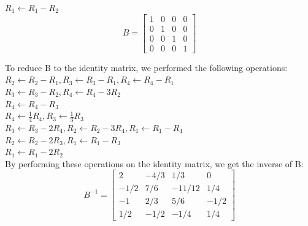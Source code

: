 \documentclass[a4paper]{article}
\begin{document}
\begin{enumerate}
\begin{enumerate}
            $R_1 \leftarrow R_1 - R_2$\\
            \[B = \begin{bmatrix} 1 & 0 & 0 & 0 \\ 0 & 1 & 0 & 0 \\ 0 & 0 & 1 & 0 \\ 0 & 0 & 0 & 1 \end{bmatrix}\]

            \newpage
            To reduce B to the identity matrix, we performed the following operations: \\
            $R_2 \leftarrow R_2 - R_1, R_3 \leftarrow R_3 - R_1, R_4 \leftarrow R_4 - R_1$\\
            $R_3 \leftarrow R_3 - R_2, R_4 \leftarrow R_4 - 3R_2$\\
            $R_4 \leftarrow R_4 - R_3$\\
            $R_4 \leftarrow \frac{1}{4}R_4, R_3 \leftarrow \frac{1}{3}R_3$\\
            $R_3 \leftarrow R_3 - 2R_4, R_2 \leftarrow R_2 - 3R_4, R_1 \leftarrow R_1 - R_4$\\
            $R_2 \leftarrow R_2 - 2R_3, R_1 \leftarrow R_1 - R_3$\\
            $R_1 \leftarrow R_1 - 2R_2$\\

            By performing these operations on the identity matrix, we get the inverse of B:
            \[B^{-1} = \begin{bmatrix} 2 & -4/3 & 1/3 & 0 \\ -1/2 & 7/6 & -11/12 & 1/4 \\ -1 & 2/3 & 5/6 & -1/2 \\ 1/2 & -1/2 & -1/4 & 1/4 \end{bmatrix}\]

        \end{enumerate} 
    \end{enumerate}


\newpage
\end{document}
